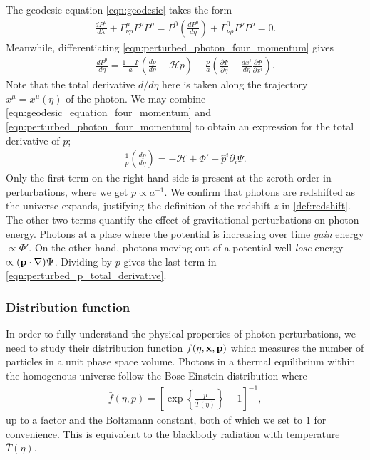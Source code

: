 The geodesic equation \eqref{eqn:geodesic} takes the form
\begin{align}
	\frac{dP^\mu}{d\lambda} + \Gamma^\mu_{\nu\rho} P^\nu P^\rho = P^0 \left( \frac{dP^0}{d\eta} \right) + \Gamma^0_{\nu\rho} P^\nu P^\rho = 0.  \label{eqn:geodesic_equation_four_momentum}
\end{align}
Meanwhile, differentiating \eqref{eqn:perturbed_photon_four_momentum} gives
\begin{align}
	\frac{dP^0}{d\eta} = \frac{1-\Psi}{a} \left( \frac{dp}{d\eta} - \mathcal{H}p \right) - \frac{p}{a} \left( \frac{\partial\Psi}{\partial\eta} + \frac{dx^i}{d\eta} \frac{\partial\Psi}{\partial x^i}  \right). \label{eqn:perturbed_energy_total_derivative}
\end{align}
Note that the total derivative $d/d\eta$ here is taken along the trajectory $x^\mu = x^\mu(\eta)$ of the photon. We may combine \eqref{eqn:geodesic_equation_four_momentum} and \eqref{eqn:perturbed_photon_four_momentum} to obtain an expression for the total derivative of $p$;
\begin{align}
	\frac{1}{p} \left( \frac{dp}{d\eta} \right) = - \mathcal{H} + \Phi' - \hat{p}^i \partial_i \Psi. \label{eqn:perturbed_p_total_derivative}
\end{align}
Only the first term on the right-hand side is present at the zeroth order in perturbations, where we get $p\propto a^{-1}$. We confirm that photons are redshifted as the universe expands, justifying the definition of the redshift $z$ in \eqref{def:redshift}. The other two terms quantify the effect of gravitational perturbations on photon energy. Photons at a place where the potential is increasing over time \textit{gain} energy $\propto\Phi'$. On the other hand, photons moving out of a potential well \textit{lose} energy $\propto({\mathbf{p}}\cdot\nabla)\Psi$. Dividing by $p$ gives the last term in \eqref{eqn:perturbed_p_total_derivative}.


\subsubsection*{Distribution function} \label{section:distribution_function}

In order to fully understand the physical properties of photon perturbations, we need to study their distribution function $f(\eta,\mathbf{x},\mathbf{p})$ which measures the number of particles in a unit phase space volume. Photons in a thermal equilibrium within the homogenous universe follow the Bose-Einstein distribution where   
\begin{align}
	\bar{f}(\eta, p) = \left[ \exp \left\{ \frac{p}{\bar{T}(\eta)} \right\} - 1 \right]^{-1}, \label{eqn:photon_distribution_function}
\end{align}
up to a factor and the Boltzmann constant, both of which we set to $1$ for convenience. This is equivalent to the blackbody radiation with temperature $\bar{T}(\eta)$.

